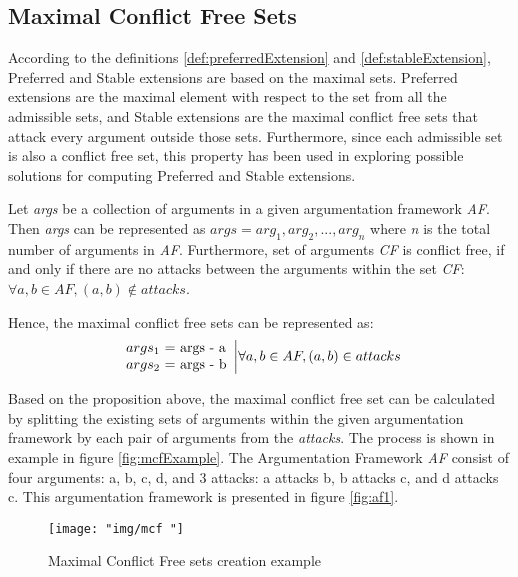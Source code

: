 \subsection{Maximal Conflict Free Sets}
According to the definitions \ref{def:preferredExtension} and \ref{def:stableExtension}, Preferred and Stable extensions are based on the maximal sets. Preferred extensions are the maximal element with respect to the set from all the admissible sets, and Stable extensions are the maximal conflict free sets that attack every argument outside those sets. Furthermore, since each admissible set is also a conflict free set, this property has been used in exploring possible solutions for computing Preferred and Stable extensions.

Let \textit{args} be a collection of arguments in a given argumentation framework \textit{AF}. Then \textit{args} can be represented as $args=arg_1, arg_2,...,arg_n$ where \textit{n} is the total number of arguments in \textit{AF}. 
Furthermore, set of arguments \textit{CF} is conflict free, if and only if there are no attacks between the arguments within the set \textit{CF}: $\forall a,b \in AF, (a, b) \notin attacks$.

Hence, the maximal conflict free sets can be represented as:
\begin{equation}
\begin{array}{lr}
args_1 $ = $ \text{args} $ - $ \text{a} \\
args_2 $ = $ \text{args} $ - $ \text{b} \\
\end{array} \bigg| \forall a, b \in AF, (a,b) \in attacks
\end{equation}

Based on the proposition above, the maximal conflict free set can be calculated by splitting the existing sets of arguments within the given argumentation framework by each pair of arguments from the \textit{attacks}. The process is shown in example in figure \ref{fig:mcfExample}. The Argumentation Framework \textit{AF} consist of four arguments: a, b, c, d, and 3 attacks: a attacks b, b attacks c, and d attacks c. This argumentation framework is presented in figure \ref{fig:af1}. 

\begin{figure}[h]
	\centering
	\texttt{[image: "img/mcf "]}
	\caption{Maximal Conflict Free sets creation example}
	\label{fig:mcf}
\end{figure}


